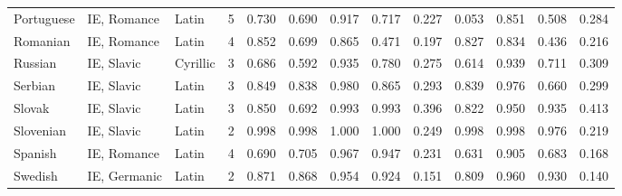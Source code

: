 \begin{tabular}{lllrrrrrrrrrr}
             Portuguese &                     IE, Romance &      Latin &         5 &                       0.730 &                         0.690 &         0.917 &                  0.717 &            0.227 &                         0.053 &         0.851 &                  0.508 &            0.284 \\
               Romanian &                     IE, Romance &      Latin &         4 &                       0.852 &                         0.699 &         0.865 &                  0.471 &            0.197 &                         0.827 &         0.834 &                  0.436 &            0.216 \\
                Russian &                      IE, Slavic &   Cyrillic &         3 &                       0.686 &                         0.592 &         0.935 &                  0.780 &            0.275 &                         0.614 &         0.939 &                  0.711 &            0.309 \\
                Serbian &                      IE, Slavic &      Latin &         3 &                       0.849 &                         0.838 &         0.980 &                  0.865 &            0.293 &                         0.839 &         0.976 &                  0.660 &            0.299 \\
                 Slovak &                      IE, Slavic &      Latin &         3 &                       0.850 &                         0.692 &         0.993 &                  0.993 &            0.396 &                         0.822 &         0.950 &                  0.935 &            0.413 \\
              Slovenian &                      IE, Slavic &      Latin &         2 &                       0.998 &                         0.998 &         1.000 &                  1.000 &            0.249 &                         0.998 &         0.998 &                  0.976 &            0.219 \\
                Spanish &                     IE, Romance &      Latin &         4 &                       0.690 &                         0.705 &         0.967 &                  0.947 &            0.231 &                         0.631 &         0.905 &                  0.683 &            0.168 \\
                Swedish &                    IE, Germanic &      Latin &         2 &                       0.871 &                         0.868 &         0.954 &                  0.924 &            0.151 &                         0.809 &         0.960 &                  0.930 &            0.140 \\

\end{tabular}
